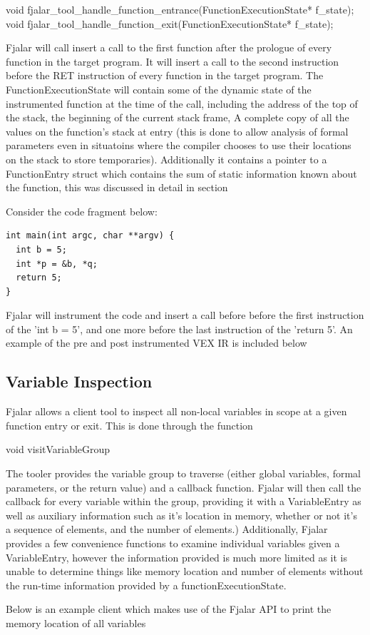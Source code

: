 \documentclass[11pt]{article}
\begin{document}
void fjalar\_tool\_handle\_function\_entrance(FunctionExecutionState* f\_state);
void fjalar\_tool\_handle\_function\_exit(FunctionExecutionState*
f\_state);

Fjalar will call insert a call to the first function after the
prologue of every function in the target program. It will insert a
call to the second instruction before the RET instruction of every
function in the target program. The FunctionExecutionState will
contain some of the dynamic state of the instrumented function at the
time of the call, including the address of the top of the stack, the
beginning of the current stack frame, A complete copy of all the
values on the function's stack at entry (this is done to allow
analysis of formal parameters even in situatoins where the compiler
chooses to use their locations on the stack to store temporaries). 
Additionally it contains a pointer to a FunctionEntry struct which
contains the sum of static information known about the function, this
was discussed in detail in section %

Consider the code fragment below:

\lstset{language=C, frame=single,}
\begin{lstlisting}
int main(int argc, char **argv) {
  int b = 5;
  int *p = &b, *q;
  return 5;
}
\end{lstlisting}

Fjalar will instrument the code and insert a call before before the
first instruction of the 'int b = 5', and one more before the last
instruction of the 'return 5'. An example of the pre and post
instrumented  VEX IR is included below



\subsection{Variable Inspection}

Fjalar allows a client tool to inspect all non-local  variables in
scope at a given function entry or exit. This is done through the
function 

void visitVariableGroup

The tooler provides the variable group to traverse (either global
variables, formal parameters, or the return value) and a callback
function. Fjalar will then call the callback for every variable within
the group, providing it with a VariableEntry as well as auxiliary
information such as it's location in memory, whether or not it's a
sequence of elements, and the number of elements.) Additionally,
Fjalar provides a few convenience functions to examine individual
variables given a VariableEntry, however the information provided is
much more limited as it is unable to determine things like memory
location and number of elements without the run-time information
provided by a functionExecutionState.

Below is an example client  which makes use of the Fjalar API to print
the memory location of all variables






\end{document}
